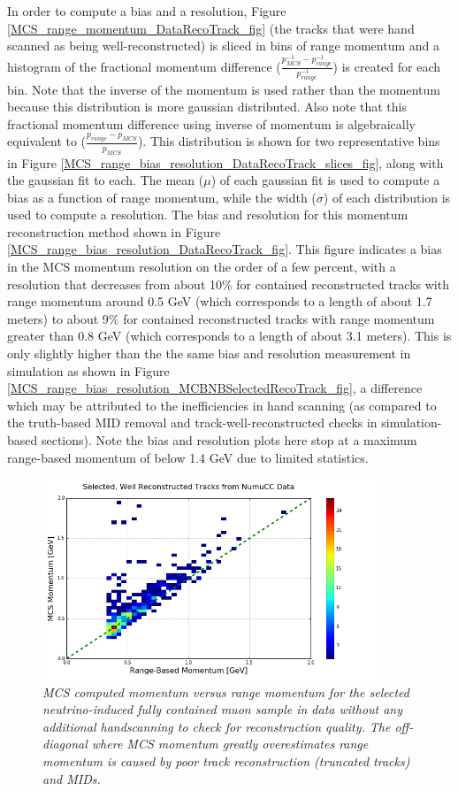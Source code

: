In order to compute a bias and a resolution, Figure \ref{MCS_range_momentum_DataRecoTrack_fig} (the tracks that were hand scanned as being well-reconstructed) is sliced in bins of range momentum and a histogram of the fractional momentum difference ($\frac{p_{MCS}^{-1} - p_{range}^{-1}}{p_{range}^{-1}}$) is created for each bin. Note that the inverse of the momentum is used rather than the momentum because this distribution is more gaussian distributed. Also note that this fractional momentum difference using inverse of momentum is algebraically equivalent to ($\frac{p_{range} - p_{MCS}}{p_{MCS}}$). This distribution is shown for two representative bins in Figure \ref{MCS_range_bias_resolution_DataRecoTrack_slices_fig}, along with the gaussian fit to each.  The mean ($\mu$) of each gaussian fit is used to compute a bias as a function of range momentum, while the width ($\sigma$) of each distribution is used to compute a resolution. The bias and resolution for this momentum reconstruction method shown in Figure \ref{MCS_range_bias_resolution_DataRecoTrack_fig}. This figure indicates a bias in the MCS momentum resolution on the order of a few percent, with a resolution that decreases from about 10\% for contained reconstructed tracks with range momentum around 0.5 GeV (which corresponds to a length of about 1.7 meters) to about 9\% for contained reconstructed tracks with range momentum greater than 0.8 GeV (which corresponds to a length of about 3.1 meters). This is only slightly higher than the the same bias and resolution measurement in simulation as shown in Figure \ref{MCS_range_bias_resolution_MCBNBSelectedRecoTrack_fig}, a difference which may be attributed to the inefficiencies in hand scanning (as compared to the truth-based MID removal and track-well-reconstructed checks in simulation-based sections). Note the bias and resolution plots here stop at a maximum range-based momentum of below 1.4 GeV due to limited statistics.


\begin{figure}[ht!]
\begin{center}
\includegraphics[width=100mm]{Figures/MCS_range_comparison_DataBNBSelectedRecoTrack.png}
\end{center}
\caption{\textit{MCS computed momentum versus range momentum for the selected neutrino-induced fully contained muon sample in data without any additional handscanning to check for reconstruction quality. The off-diagonal where MCS momentum greatly overestimates range momentum is caused by poor track reconstruction (truncated tracks) and MIDs.}}
\label{MCS_range_momentum_DataRecoTrack_nohandscan_fig}
\end{figure}

